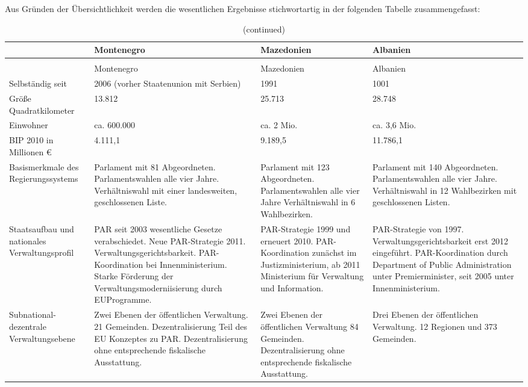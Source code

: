 Aus Gründen der Übersichtlichkeit werden die wesentlichen Ergebnisse stichwortartig in der folgenden Tabelle zusammengefasst:
\begin{longtable}[H]{|L{24mm}|C{34mm}|C{34mm}|C{34mm}|}
\caption[Schematische Darstellung zur Verwaltungsentwicklung der Untersuchungsländer ]{Schematische Darstellung zur Verwaltungsentwicklung der Untersuchungsländer }\\\hline
&Montenegro&Mazedonien&Albanien\\\hline
\endfirsthead
\caption[]{(continued)}\\\hline
&Montenegro&Mazedonien&Albanien\\\hline
\endhead 
\hline
\endfoot
\hline
\endlastfoot
Selbständig seit&2006 (vorher Staatenunion mit Serbien)&1991&1001\\\hline
Größe Quadratkilometer&13.812&25.713&28.748\\\hline
Einwohner &ca. 600.000&ca. 2 Mio.&ca. 3,6 Mio.\\\hline
BIP 2010 in Millionen \euro{}&4.111,1&9.189,5&11.786,1\\\hline
Basismerkmale des Regierungssystems&
Parlament mit 81 Abgeordneten. 
Parlamentswahlen alle vier Jahre.
Verhältniswahl mit einer landesweiten, geschlossenen Liste.&
Parlament mit 123 Abgeordneten.
Parlamentswahlen alle vier Jahre
Verhältniswahl in 6 Wahlbezirken.&
Parlament mit 140 Abgeordneten.
Parlamentswahlen alle vier Jahre.
Verhältniswahl in 12 Wahlbezirken mit geschlossenen Listen.\\\hline
Staatsaufbau und nationales Verwaltungsprofil&
PAR seit 2003 wesentliche Gesetze verabschiedet.
Neue PAR-Strategie 2011.
Verwaltungsgerichtsbarkeit.
PAR-Koordination bei Innenministerium.
Starke Förderung der Verwaltungsmoderniisierung durch EUProgramme.&
PAR-Strategie 1999 und erneuert 2010.
PAR-Koordination zunächst im Justizministerium, ab 2011 Ministerium für Verwaltung und Information.&
PAR-Strategie von 1997.
Verwaltungsgerichtsbarkeit erst 2012 eingeführt.
PAR-Koordination durch Department of Public Administration 
unter Premierminister,
seit 2005 unter Innenministerium.\\\hline
Subnational-dezentrale Verwaltungsebene&
Zwei Ebenen der öffentlichen Verwaltung.
21 Gemeinden.
Dezentralisierung Teil des EU Konzeptes zu PAR.
Dezentralisierung ohne entsprechende fiskalische Ausstattung. &
Zwei Ebenen der öffentlichen Verwaltung
 84 Gemeinden.
Dezentralisierung ohne entsprechende fiskalische Ausstattung. &
Drei Ebenen der öffentlichen Verwaltung.
12 Regionen und 373 Gemeinden.

\end{longtable}
